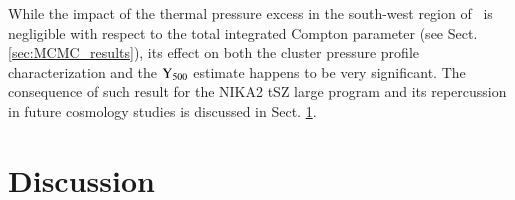 \documentclass[traditabstract]{aa}
\begin{document}
\indent While the impact of the thermal pressure excess in the south-west region of \psz\ is negligible with respect to the total integrated Compton parameter (see Sect. \ref{sec:MCMC_results}), its effect on both the cluster pressure profile characterization and the $\rm{Y_{500}}$ estimate happens to be very significant. The consequence of such result for the NIKA2 tSZ large program and its repercussion in future cosmology studies is discussed in Sect. \ref{sec:discussion}. 

\section{Discussion}\label{sec:discussion}
\end{document}
